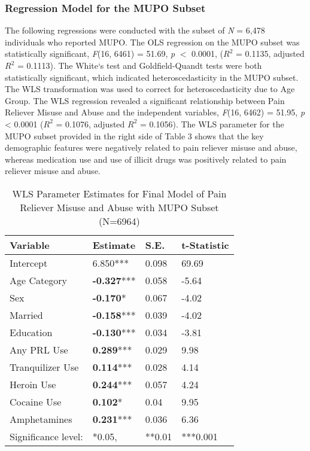\documentclass[sigconf]{acmart}
\begin{document}

\subsubsection{Regression Model for the MUPO Subset} 

The following regressions were conducted with the subset of \textit{N} = 6,478 
individuals who reported MUPO. The OLS regression on the MUPO subset was 
statistically significant, \textit{F}(16, 6461) = 51.69, \textit{p} $<$ 0.0001, 
($R^2$ = 0.1135, adjusted $R^2$ = 0.1113). The White`s test and Goldfield-Quandt 
tests were both statistically significant, which indicated heteroscedasticity 
in the MUPO subset. The WLS transformation was used to correct for 
heteroscedasticity due to Age Group. The WLS regression revealed a significant 
relationship between Pain Reliever Misuse and Abuse and the independent 
variables, \textit{F}(16, 6462) = 51.95, \textit{p} < 0.0001 ($R^2$ = 0.1076, 
adjusted $R^2$ = 0.1056). The WLS parameter for the MUPO subset provided in 
the right side of Table 3 shows that the key demographic features were 
negatively related to pain reliever misuse and abuse, whereas medication 
use and use of illicit drugs was positively related to pain reliever misuse 
and abuse. 

\begin{table}
  \caption{WLS Parameter Estimates for Final Model of Pain Reliever Misuse and 
  Abuse with MUPO Subset (N=6964)}
  \label{tab:freq}
  \begin{tabular}{llll}
    \toprule
    Variable & Estimate& S.E.& t-Statistic \\
    \midrule
    Intercept& 6.850***& 0.098& 69.69 \\
    Age Category& \textbf{-0.327}***& 0.058& -5.64 \\
    Sex& \textbf{-0.170}*& 0.067& -4.02 \\
    Married& \textbf{-0.158}***& 0.039& -4.02 \\
    Education& \textbf{-0.130}***& 0.034& -3.81 \\
    Any PRL Use& \textbf{0.289}***& 0.029& 9.98 \\
    Tranquilizer Use& \textbf{0.114}***& 0.028& 4.14 \\
    Heroin Use& \textbf{0.244}***& 0.057& 4.24 \\
    Cocaine Use& \textbf{0.102}*& 0.04& 9.95 \\
    Amphetamines& \textbf{0.231}***& 0.036& 6.36 \\
    \bottomrule
    Significance level:& *0.05,& **0.01& ***0.001
  \end{tabular}
\end{table}
\end{document}
